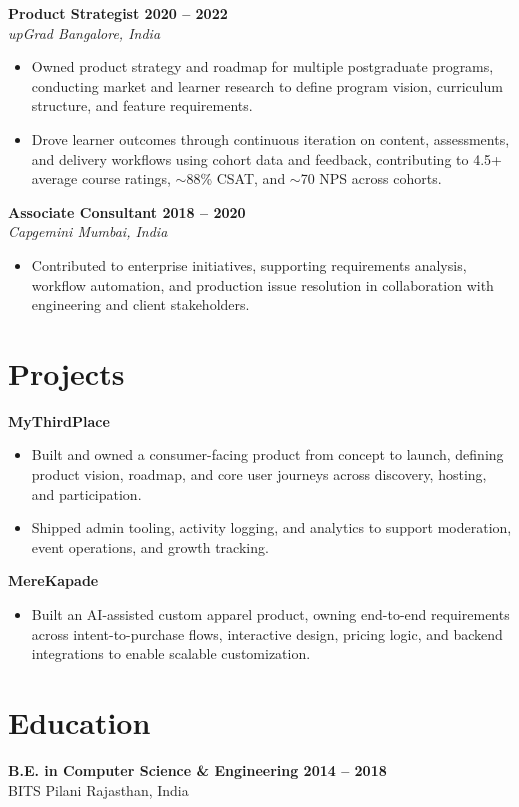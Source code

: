 \documentclass[10pt,a4paper]{article}
\begin{document}
\textbf{Product Strategist \textbar{} 2020 -- 2022} \\
\textit{upGrad \textbar{} Bangalore, India}
\begin{itemize}
  \item Owned product strategy and roadmap for multiple postgraduate programs, conducting market and learner research to define program vision, curriculum structure, and feature requirements.
  \item Drove learner outcomes through continuous iteration on content, assessments, and delivery workflows using cohort data and feedback, contributing to 4.5+ average course ratings, $\sim$88\% CSAT, and $\sim$70 NPS across cohorts.
\end{itemize}

\textbf{Associate Consultant \textbar{} 2018 -- 2020} \\
\textit{Capgemini \textbar{} Mumbai, India}
\begin{itemize}
  \item Contributed to enterprise initiatives, supporting requirements analysis, workflow automation, and production issue resolution in collaboration with engineering and client stakeholders.
\end{itemize}

\section*{Projects}

\textbf{MyThirdPlace}
\begin{itemize}
  \item Built and owned a consumer-facing product from concept to launch, defining product vision, roadmap, and core user journeys across discovery, hosting, and participation.
  \item Shipped admin tooling, activity logging, and analytics to support moderation, event operations, and growth tracking.
\end{itemize}

\textbf{MereKapade}
\begin{itemize}
  \item Built an AI-assisted custom apparel product, owning end-to-end requirements across intent-to-purchase flows, interactive design, pricing logic, and backend integrations to enable scalable customization.
\end{itemize}

\section*{Education}
\textbf{B.E. in Computer Science \& Engineering \textbar{} 2014 -- 2018} \\
BITS Pilani \textbar{} Rajasthan, India
\end{document}
